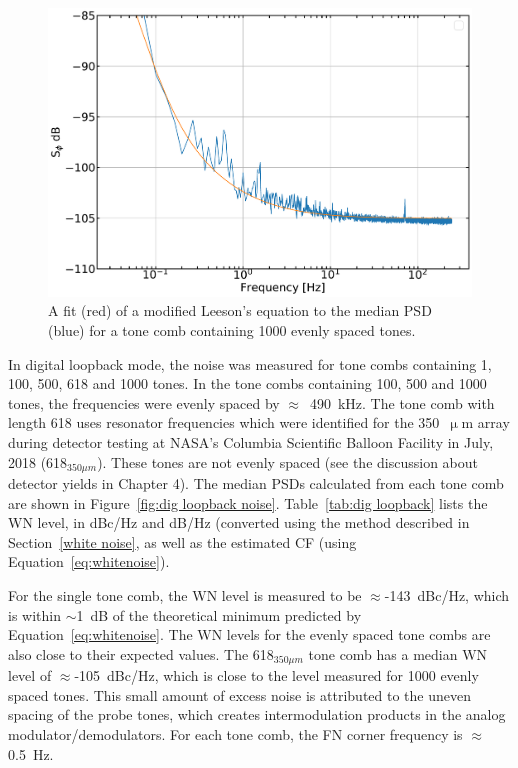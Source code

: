 \begin{figure}[!htbp]
\centering
\includegraphics[width=\textwidth]{figures/readout/sim/c1000_PSD_fit}
\caption[~A fit of a modified Leeson's equation to the median PSD for a tone comb containing 1000 evenly spaced tones.]{A fit (red) of a modified Leeson's equation to the median PSD (blue) for a tone comb containing 1000 evenly spaced tones.}
\label{fig:psd 1000 fit}
\end{figure}

In digital loopback mode, the noise was measured for tone combs containing 1, 100, 500, 618 and 1000 tones. In the tone combs containing 100, 500 and 1000 tones, the frequencies were evenly spaced by $\approx$~490~kHz. The tone comb with length 618 uses resonator frequencies which were identified for the 350~$\upmu$m array during detector testing at NASA's Columbia Scientific Balloon Facility in July, 2018 (618$_{350\mu m}$). These tones are not evenly spaced (see the discussion about detector yields in Chapter 4). The median PSDs calculated from each tone comb are shown in Figure~\ref{fig:dig loopback noise}. Table~\ref{tab:dig loopback} lists the WN level, in dBc/Hz and dB/Hz (converted using the method described in Section~\ref{white noise}, as well as the estimated CF (using Equation~\ref{eq:whitenoise}).

For the single tone comb, the WN level is measured to be $\approx$-143~dBc/Hz, which is within $\sim$1~dB of the theoretical minimum predicted by Equation~\ref{eq:whitenoise}. The WN levels for the evenly spaced tone combs are also close to their expected values. The 618$_{350\mu m}$ tone comb has a median WN level of $\approx$-105~dBc/Hz, which is close to the level measured for 1000 evenly spaced tones. This small amount of excess noise is attributed to the uneven spacing of the probe tones, which creates intermodulation products in the analog modulator/demodulators. For each tone comb, the FN corner frequency is $\approx$0.5~Hz.

